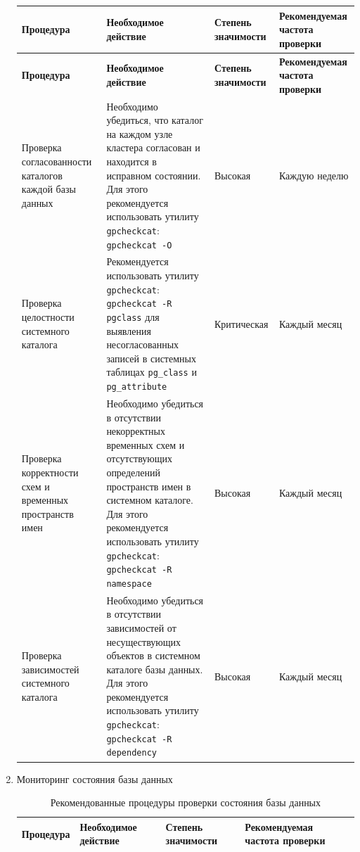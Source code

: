 \begin{enumerate}[1.]
{\begin{longtable}{|p{3.5cm}|p{6.5cm}|p{2.2cm}|p{2.8cm}|}
			\hline
			\textbf{Процедура} & \textbf{Необходимое действие} & \textbf{Степень значимости} & \textbf{Рекомендуемая частота проверки} \\
			\hline
			\endfirsthead
			
			\hline
			\textbf{Процедура} & \textbf{Необходимое действие} & \textbf{Степень значимости} & \textbf{Рекомендуемая частота проверки} \\
			\hline
			\endhead
			
			Проверка согласованности каталогов каждой базы данных &
			Необходимо убедиться, что каталог на каждом узле кластера согласован и находится в исправном состоянии. Для этого рекомендуется использовать утилиту \texttt{gpcheckcat}: \texttt{gpcheckcat -O}  &
			Высокая & Каждую неделю \\
			\hline
			
			Проверка целостности системного каталога &
			Рекомендуется использовать утилиту \texttt{gpcheckcat}: \texttt{gpcheckcat -R pgclass} для выявления несогласованных записей в системных таблицах \texttt{pg\_class} и \texttt{pg\_attribute} &
			Критическая & Каждый месяц \\
			\hline
			
			Проверка корректности схем и временных пространств имен &
			Необходимо убедиться в отсутствии некорректных временных схем и отсутствующих определений пространств имен в системном каталоге. Для этого рекомендуется использовать утилиту \texttt{gpcheckcat}: \texttt{gpcheckcat -R namespace} &
			Высокая & Каждый месяц  \\
			\hline
			
			Проверка зависимостей системного каталога &
			Необходимо убедиться в отсутствии зависимостей от несуществующих объектов в системном каталоге базы данных. Для этого рекомендуется использовать утилиту \texttt{gpcheckcat}: \texttt{gpcheckcat -R dependency} &
			Высокая & Каждый месяц  \\
			\hline
		\end{longtable}
	
	}
	
	\item Мониторинг состояния базы данных
	
	{\small 
		\begin{longtable}{|p{3.5cm}|p{6.5cm}|p{2.2cm}|p{2.8cm}|}
			\caption{Рекомендованные процедуры проверки состояния базы данных}
			\label{tab:table_5} \\
			
			\hline
			\textbf{Процедура} & \textbf{Необходимое действие} & \textbf{Степень значимости} & \textbf{Рекомендуемая частота проверки} \\
			\hline
			\endfirsthead
			

\end{longtable}}
\end{enumerate}
